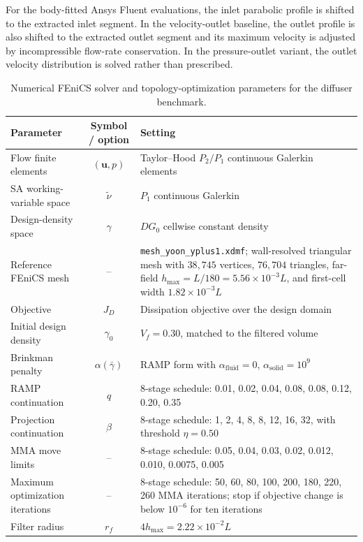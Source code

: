 For the body-fitted Ansys Fluent evaluations, the inlet parabolic profile is shifted to the extracted inlet segment. In the velocity-outlet baseline, the outlet profile is also shifted to the extracted outlet segment and its maximum velocity is adjusted by incompressible flow-rate conservation. In the pressure-outlet variant, the outlet velocity distribution is solved rather than prescribed.

\begin{table}[htbp]
	\centering
	\footnotesize
	\caption{Numerical FEniCS solver and topology-optimization parameters for the diffuser benchmark.}
	\label{tab:app_B_yoon_diffuser_numerical}
	\renewcommand{\arraystretch}{1.2}
	\begin{tabularx}{\textwidth}{l c X}
		\hline
		\textbf{Parameter} & \textbf{Symbol / option} & \textbf{Setting} \\
		\hline
		Flow finite elements & $(\mathbf{u},p)$ & Taylor--Hood $P_2/P_1$ continuous Galerkin elements \\
		SA working-variable space & $\tilde{\nu}$ & $P_1$ continuous Galerkin \\
		Design-density space & $\gamma$ & $DG_0$ cellwise constant density \\
		Reference FEniCS mesh & -- & \texttt{mesh\_yoon\_yplus1.xdmf}; wall-resolved triangular mesh with $38{,}745$ vertices, $76{,}704$ triangles, far-field $h_{\max}=L/180=5.56\times10^{-3}L$, and first-cell width $1.82\times10^{-3}L$ \\
		Objective & $J_D$ & Dissipation objective over the design domain \\
		Initial design density & $\gamma_0$ & $V_f=0.30$, matched to the filtered volume \\
		Brinkman penalty & $\alpha(\bar{\gamma})$ & RAMP form with $\alpha_{\mathrm{fluid}}=0$, $\alpha_{\mathrm{solid}}=10^9$ \\
			RAMP continuation & $q$ & 8-stage schedule: 0.01, 0.02, 0.04, 0.08, 0.08, 0.12, 0.20, 0.35 \\
			Projection continuation & $\beta$ & 8-stage schedule: 1, 2, 4, 8, 8, 12, 16, 32, with threshold $\eta=0.50$ \\
			MMA move limits & -- & 8-stage schedule: 0.05, 0.04, 0.03, 0.02, 0.012, 0.010, 0.0075, 0.005 \\
			Maximum optimization iterations & -- & 8-stage schedule: 50, 60, 80, 100, 200, 180, 220, 260 MMA iterations; stop if objective change is below $10^{-6}$ for ten iterations \\
		Filter radius & $r_f$ & $4h_{\max}=2.22\times10^{-2}L$ \\

\end{tabularx}
\end{table}
